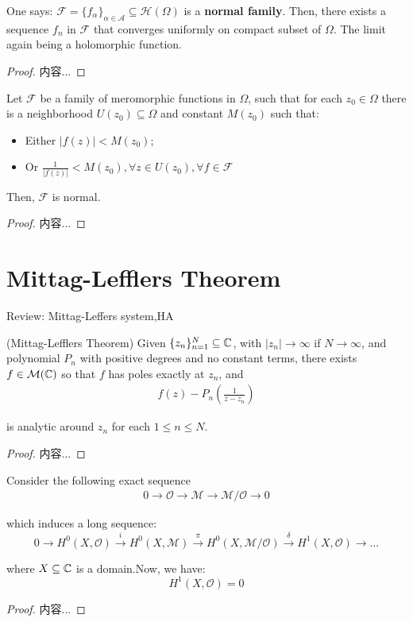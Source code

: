 \documentclass[Total.tex]{subfiles}
\begin{document}
			\begin{proposition}
				One says: $\mathcal{F}=\{f_\alpha\}_{\alpha\in \mathcal{A}}\subseteq \mathcal{H}(\Omega)$ is a \textbf{normal family}. Then, there exists a sequence $f_n$ in $\mathcal{F}$ that converges uniformly on compact subset of $\Omega$. The limit again being a holomorphic function.
			\end{proposition}
			\begin{proof}
				内容...
			\end{proof}
			
			\begin{theorem}
				Let $\mathscr{F}$ be a family of meromorphic functions in $\Omega$, such that for each $z_0\in \Omega$ there is a neighborhood $U(z_0)\subseteq \Omega$ and constant $M(z_0)$ such that:
				\begin{itemize}
					\item Either $|f(z)|<M(z_0)$;
					\item Or $\frac{1}{|f(z)|}<M(z_0),\forall z\in U(z_0),\forall f\in \mathscr{F}$
				\end{itemize}
				
				Then, $\mathscr{F}$ is normal.
			\end{theorem}
			\begin{proof}
				内容...
			\end{proof}
		\section{Mittag-Lefflers Theorem}
			Review: Mittag-Leffers system,HA
			
			\begin{theorem}
				(Mittag-Lefflers Theorem) Given $\{z_n\}_{n=1}^N\subseteq \mathbb{C}$, with $|z_n|\rightarrow \infty$ if $N\rightarrow \infty$, and polynomial $P_n$ with positive degrees and no constant terms, there exists $f\in \mathcal{M}(\mathbb{C})$ so that $f$ has poles exactly at $z_n$, and
				\begin{gather*}
					f(z)-P_n(\frac{1}{z-z_n})
				\end{gather*} 
				
				is analytic around $z_n$ for each $1\leq n\leq N$.
			\end{theorem}
			\begin{proof}
				内容...
			\end{proof}
			
			\begin{corollary}
				Consider the following exact sequence
				\begin{gather*}
					0\rightarrow \mathcal{O}\rightarrow \mathcal{M}\rightarrow \mathcal{M}/\mathcal{O}\rightarrow 0
				\end{gather*}
				
				which induces a long sequence:$$0 \to H^0(X, \mathcal{O}) \xrightarrow{i} H^0(X, \mathcal{M}) \xrightarrow{\pi} H^0(X, \mathcal{M}/\mathcal{O}) \xrightarrow{\delta} H^1(X, \mathcal{O}) \to \dots$$
				
				where $X\subseteq\mathbb{C}$ is a domain.Now, we have:$$H^1(X, \mathcal{O}) = 0$$
			\end{corollary}
			\begin{proof}
				内容...
			\end{proof}
\end{document}
